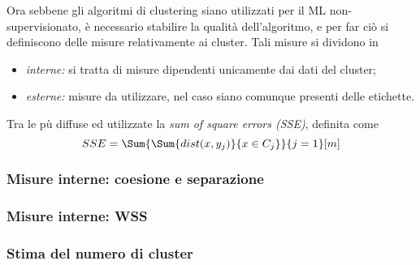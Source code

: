 \documentclass{subfiles}
\begin{document}
Ora sebbene gli algoritmi di clustering siano utilizzati per il ML non-supervisionato, è necessario stabilire la qualità dell'algoritmo,
e per far ciò si definiscono delle misure relativamente ai cluster. Tali misure si dividono in
\begin{itemize}
    \item \emph{interne:} si tratta di misure dipendenti unicamente dai dati del cluster;
    \item \emph{esterne:} misure da utilizzare, nel caso siano comunque presenti delle etichette.
\end{itemize}
Tra le pù diffuse ed utilizzate la \emph{sum of square errors (SSE)}, definita come
$$
    SSE = \Sum{\Sum{dist(x, y_{j})}{x \in C_{j}}}{j = 1}[m]
$$

\subsubsection{Misure interne: coesione e separazione}


\subsubsection{Misure interne: WSS}


\subsubsection{Stima del numero di cluster}

\end{document}
